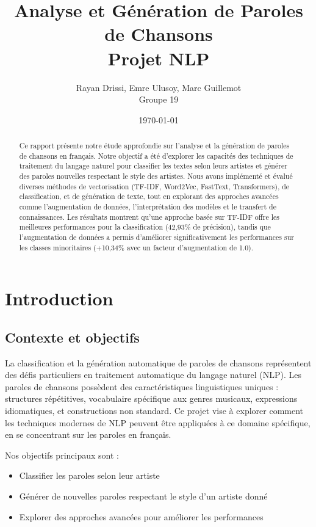 \documentclass[a4paper,11pt]{article}
\title{\textbf{Analyse et Génération de Paroles de Chansons\\
Projet NLP}}
\author{Rayan Drissi, Emre Ulusoy, Marc Guillemot\\
Groupe 19}
\date{\today}
\begin{document}
\maketitle

\begin{abstract}
Ce rapport présente notre étude approfondie sur l'analyse et la génération de paroles de chansons en français. Notre objectif a été d'explorer les capacités des techniques de traitement du langage naturel pour classifier les textes selon leurs artistes et générer des paroles nouvelles respectant le style des artistes. Nous avons implémenté et évalué diverses méthodes de vectorisation (TF-IDF, Word2Vec, FastText, Transformers), de classification, et de génération de texte, tout en explorant des approches avancées comme l'augmentation de données, l'interprétation des modèles et le transfert de connaissances. Les résultats montrent qu'une approche basée sur TF-IDF offre les meilleures performances pour la classification (42,93\% de précision), tandis que l'augmentation de données a permis d'améliorer significativement les performances sur les classes minoritaires (+10,34\% avec un facteur d'augmentation de 1.0).
\end{abstract}

\newpage

\tableofcontents

\newpage


\section{Introduction}
\subsection{Contexte et objectifs}
La classification et la génération automatique de paroles de chansons représentent des défis particuliers en traitement automatique du langage naturel (NLP). Les paroles de chansons possèdent des caractéristiques linguistiques uniques : structures répétitives, vocabulaire spécifique aux genres musicaux, expressions idiomatiques, et constructions non standard. Ce projet vise à explorer comment les techniques modernes de NLP peuvent être appliquées à ce domaine spécifique, en se concentrant sur les paroles en français.

Nos objectifs principaux sont :
\begin{itemize}
    \item Classifier les paroles selon leur artiste
    \item Générer de nouvelles paroles respectant le style d'un artiste donné
    \item Explorer des approches avancées pour améliorer les performances
\end{itemize}
\end{document}
